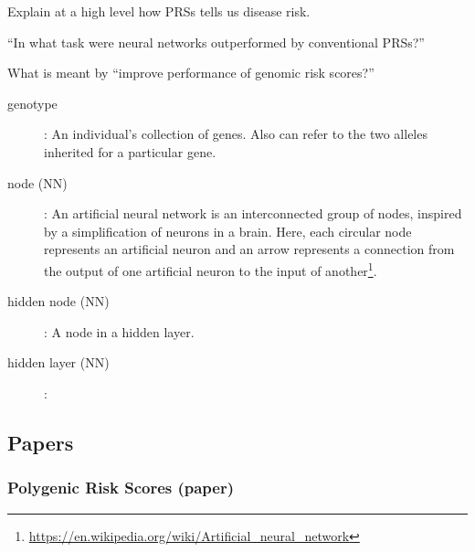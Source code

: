\begin{quest}
\item
	Explain at a high level how PRSs tells us disease risk.
\item
	``In what task were neural networks outperformed by conventional PRSs?''
\item
	What is meant by ``improve performance of genomic risk scores?''
\end{quest}

\begin{description}
\item[genotype]:
	An individual's collection of genes. Also can refer to the two alleles inherited for a particular gene.

\item[node (NN)]:
	An artificial neural network is an interconnected group of nodes, inspired by a simplification of neurons in a brain. Here, each circular node represents an artificial neuron and an arrow represents a connection from the output of one artificial neuron to the input of another\footnote{\url{https://en.wikipedia.org/wiki/Artificial_neural_network}}.
\item[hidden node (NN)] : A node in a hidden layer.

\item[hidden layer (NN)]:

\end{description}
\subsection{Papers}
\subsubsection*{Polygenic Risk Scores (paper) \cite{wray2010multi}}
